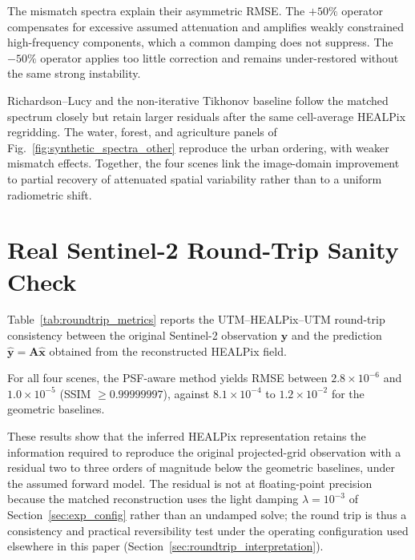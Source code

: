 \documentclass[journal]{IEEEtran}
\newcommand{\healpix}{HEALPix\xspace}
\newcommand{\utm}{UTM\xspace}
\newcommand{\psf}{PSF\xspace}
\begin{document}
The mismatch spectra explain their asymmetric RMSE. The $+50\%$
operator compensates for excessive assumed attenuation and
amplifies weakly constrained high-frequency components, which a common
damping does not suppress. The $-50\%$ operator applies too little
correction and remains under-restored without the same strong
instability.

Richardson--Lucy and the non-iterative Tikhonov baseline follow the
matched spectrum closely but retain larger residuals after the same
cell-average \healpix regridding. The water, forest, and agriculture
panels of Fig.~\ref{fig:synthetic_spectra_other} reproduce the urban
ordering, with weaker mismatch effects.
Together, the four scenes link the image-domain improvement to
partial recovery of attenuated spatial variability rather than to
a uniform radiometric shift.

\section{Real Sentinel-2 Round-Trip Sanity Check}
\label{sec:roundtrip_results}

Table~\ref{tab:roundtrip_metrics} reports the
\utm--\healpix--\utm round-trip consistency between the original
Sentinel-2 observation $\mathbf{y}$ and the prediction
$\widehat{\mathbf{y}}=\mathbf{A}\widehat{\mathbf{x}}$ obtained
from the reconstructed \healpix field.

For all four scenes, the \psf-aware method yields RMSE between
$2.8\times10^{-6}$ and $1.0\times10^{-5}$ (SSIM
$\geq0.99999997$), against $8.1\times10^{-4}$ to
$1.2\times10^{-2}$ for the geometric baselines.

These results show that the inferred \healpix representation
retains the information required to reproduce the original
projected-grid observation with a residual two to three orders of
magnitude below the geometric baselines, under the assumed forward
model. The residual is not at floating-point precision because the
matched reconstruction uses the light damping $\lambda=10^{-3}$ of
Section~\ref{sec:exp_config} rather than an undamped solve; the
round trip is thus a consistency and practical reversibility test
under the operating configuration used elsewhere in this paper
(Section~\ref{sec:roundtrip_interpretation}).
\end{document}
